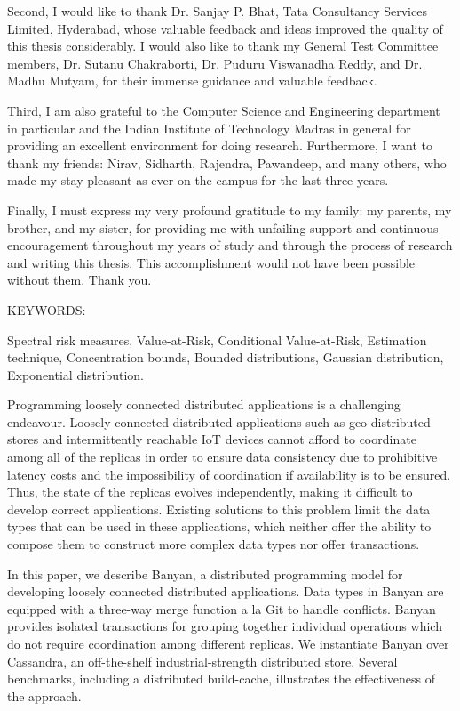 Second, I would like to thank Dr. Sanjay P. Bhat, Tata Consultancy Services Limited, Hyderabad, whose valuable feedback and ideas improved the quality of this thesis considerably. I would also like to thank my General Test Committee members, Dr. Sutanu Chakraborti, Dr. Puduru Viswanadha Reddy, and Dr. Madhu Mutyam, for their immense guidance and valuable feedback.

Third, I am also grateful to the Computer Science and Engineering department in particular and the Indian Institute of Technology Madras in general for providing an excellent environment for doing research. Furthermore, I want to thank my friends: Nirav, Sidharth, Rajendra, Pawandeep, and many others, who made my stay pleasant as ever on the campus for the last three years.

Finally, I must express my very profound gratitude to my family: my parents, my brother, and my sister, for providing me with unfailing support and continuous encouragement throughout my years of study and through the process of research and writing this thesis. This accomplishment would not have been possible without them. Thank you.


\abstract

\noindent KEYWORDS: \hspace*{0.5em} \parbox[t]{4.4in}{Spectral risk measures, Value-at-Risk, Conditional Value-at-Risk, Estimation technique, Concentration bounds, Bounded distributions, Gaussian distribution, Exponential distribution.}

\vspace*{24pt}

\noindent 
Programming loosely connected distributed applications is a challenging
endeavour. Loosely connected distributed applications such as geo-distributed
stores and intermittently reachable IoT devices cannot afford to coordinate
among all of the replicas in order to ensure data consistency due to
prohibitive latency costs and the impossibility of coordination if
availability is to be ensured. Thus, the state of the replicas evolves
independently, making it difficult to develop correct applications. Existing
solutions to this problem limit the data types that can be used in these
applications, which neither offer the ability to compose them to construct
more complex data types nor offer transactions.

In this paper, we describe Banyan, a distributed programming model for
developing loosely connected distributed applications. Data types in Banyan
are equipped with a three-way merge function a la Git to handle conflicts.
Banyan provides isolated transactions for grouping together individual
operations which do not require coordination among different replicas. We
instantiate Banyan over Cassandra, an off-the-shelf industrial-strength
distributed store. Several benchmarks, including a distributed build-cache,
illustrates the effectiveness of the approach.

